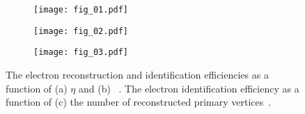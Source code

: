 \begin{figure}[htbp]
    \begin{subfigure}[b]{0.32\textwidth}
        \begin{center}
            \texttt{[image: fig\_01.pdf]}
            \caption{}
        \end{center}
    \end{subfigure}
    \begin{subfigure}[b]{0.32\textwidth}
        \begin{center}
            \texttt{[image: fig\_02.pdf]}
            \caption{}
        \end{center}
    \end{subfigure}
    \begin{subfigure}[b]{0.32\textwidth}
        \begin{center}
            \texttt{[image: fig\_03.pdf]}
            \caption{}
        \end{center}
    \end{subfigure}
    \caption{The electron reconstruction and identification efficiencies as a function of (a) $\eta$ and (b) \met~\cite{ATLAS:EGAM-2017-003}.
    The electron identification efficiency as a function of (c) the number of reconstructed primary vertices~\cite{ATLAS:EGAM-2016-005}.}
    \label{fig:app_electron_isolation_2016_electron_ID_efficiencies}
\end{figure}


